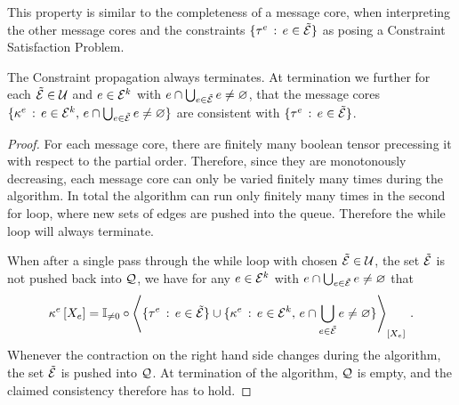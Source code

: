 This property is similar to the completeness of a message core, when interpreting the other message cores and the constraints $\{\tau^{e} \,:\, e\in\tilde{\mathcal{E}}\}$ as posing a Constraint Satisfaction Problem.

\begin{theorem}
    The Constraint propagation  always terminates.
    At termination we further for each $\tilde{\mathcal{E}}\in\mathcal{U}$ and $e\in\mathcal{E}^{k}$ with $e\cap\bigcup_{e\in\tilde{\mathcal{E}}}e\neq\varnothing$, that the message cores $\{\kappa^{e} \,:\, e\in\mathcal{E}^{k}, \, e\cap\bigcup_{e\in\tilde{\mathcal{E}}}e\neq\varnothing\}$ are consistent with $\{\tau^{e} \,:\, e\in\tilde{\mathcal{E}}\}$.
\end{theorem}
\begin{proof}
    For each message core, there are finitely many boolean tensor precessing it with respect to the partial order.
    Therefore, since they are monotonously decreasing, each message core can only be varied finitely many times during the algorithm.
    In total the algorithm can run only finitely many times in the second for loop, where new sets of edges are pushed into the queue.
    Therefore the while loop will always terminate.

    When after a single pass through the while loop with chosen $\tilde{\mathcal{E}}\in\mathcal{U}$, the set $\tilde{\mathcal{E}}$ is not pushed back into $\mathcal{Q}$, we have for any $e\in\mathcal{E}^{k}$ with $e\cap\bigcup_{e\in\tilde{\mathcal{E}}}e\neq\varnothing$ that
    \begin{align*}
        \kappa^{e}\left[X_{e}\right]
        = \mathbb{I}_{\neq0}\circ\left\langle \{\tau^{e} \,:\, e\in\tilde{\mathcal{E}}\} \cup \{\kappa^{e} \,:\, e\in\mathcal{E}^{k}, \, e\cap\bigcup_{e\in\tilde{\mathcal{E}}}e\neq\varnothing\}\right\rangle_{\left[ X_{e} \right]} \, .
    \end{align*}
    Whenever the contraction on the right hand side changes during the algorithm, the set $\tilde{\mathcal{E}}$ is pushed into $\mathcal{Q}$.
    At termination of the algorithm, $\mathcal{Q}$ is empty, and the claimed consistency therefore has to hold.
\end{proof}



